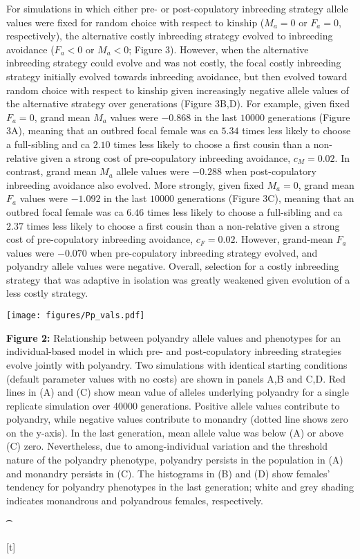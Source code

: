 \documentclass[10pt,letterpaper]{article}
\begin{document}
For simulations in which either pre- or post-copulatory inbreeding strategy allele values were fixed for random choice with respect to kinship ($M_{a}=0$ or $F_{a}=0$, respectively), the alternative costly inbreeding strategy evolved to inbreeding avoidance ($F_{a}<0$ or $M_{a}<0$; Figure 3). However, when the alternative inbreeding strategy could evolve and was not costly, the focal costly inbreeding strategy initially evolved towards inbreeding avoidance, but then evolved toward random choice with respect to kinship given increasingly negative allele values of the alternative strategy over generations (Figure 3B,D). For example, given fixed $F_{a}=0$, grand mean $M_{a}$ values were $-0.868$ in the last $10000$ generations (Figure 3A), meaning that an outbred focal female was ca $5.34$ times less likely to choose a full-sibling and ca $2.10$ times less likely to choose a first cousin than a non-relative given a strong cost of pre-copulatory inbreeding avoidance, $c_{M}=0.02$. In contrast, grand mean $M_{a}$ allele values were $-0.288$ when post-copulatory inbreeding avoidance also evolved. More strongly, given fixed $M_{a}=0$, grand mean $F_{a}$ values were $-1.092$ in the last $10000$ generations (Figure 3C), meaning that an outbred focal female was ca $6.46$ times less likely to choose a full-sibling and ca $2.37$ times less likely to choose a first cousin than a non-relative given a strong cost of pre-copulatory inbreeding avoidance, $c_{F}=0.02$. However, grand-mean $F_{a}$ values were $-0.070$ when pre-copulatory inbreeding strategy evolved, and polyandry allele values were negative. Overall, selection for a costly inbreeding strategy that was adaptive in isolation was greatly weakened given evolution of a less costly strategy.

{\color{Gray}
\begin{adjustwidth}{-2.5in}{0in}
{%
   \texttt{[image: figures/Pp\_vals.pdf]}%
}%
{%
   \begin{justify}\vspace{0.25 mm} \textbf{Figure 2:} Relationship between polyandry allele values and phenotypes for an individual-based model in which pre- and post-copulatory inbreeding strategies evolve jointly with polyandry. Two simulations with identical starting conditions (default parameter values with no costs) are shown in panels A,B and C,D. Red lines in (A) and (C) show mean value of alleles underlying polyandry for a single replicate simulation over 40000 generations. Positive allele values contribute to polyandry, while negative values contribute to monandry (dotted line shows zero on the y-axis). In the last generation, mean allele value was below (A) or above (C) zero. Nevertheless, due to among-individual variation and the threshold nature of the polyandry phenotype, polyandry persists in the population in (A) and monandry persists in (C). The histograms in (B) and (D) show females' tendency for polyandry phenotypes in the last generation; white and grey shading indicates monandrous and polyandrous females, respectively.\end{justify}{\t}%
}[t]
\end{adjustwidth}
}
\end{document}
